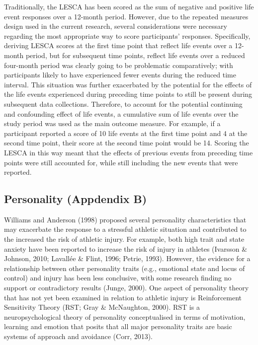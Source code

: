 \documentclass[man,floatsintext]{apa6}
\begin{document}
Traditionally, the LESCA has been scored as the sum of negative and positive life event responses over a 12-month period.
However, due to the repeated measures design used in the current research, several considerations were necessary regarding the most appropriate way to score participants' responses.
Specifically, deriving LESCA scores at the first time point that reflect life events over a 12-month period, but for subsequent time points, reflect life events over a reduced four-month period was clearly going to be problematic comparatively; with participants likely to have experienced fewer events during the reduced time interval.
This situation was further exacerbated by the potential for the effects of the life events experienced during preceding time points to still be present during subsequent data collections.
Therefore, to account for the potential continuing and confounding effect of life events, a cumulative sum of life events over the study period was used as the main outcome measure.
For example, if a participant reported a score of 10 life events at the first time point and 4 at the second time point, their score at the second time point would be 14.
Scoring the LESCA in this way meant that the effects of previous events from preceding time points were still accounted for, while still including the new events that were reported.

\hypertarget{personality-appdendix-b}{%
\subsection{Personality (Appdendix B)}\label{personality-appdendix-b}}

Williams and Anderson (1998) proposed several personality characteristics that may exacerbate the response to a stressful athletic situation and contributed to the increased the risk of athletic injury.
For example, both high trait and state anxiety have been reported to increase the risk of injury in athletes (Ivarsson \& Johnson, 2010; Lavallée \& Flint, 1996; Petrie, 1993).
However, the evidence for a relationship between other personality traits (e.g., emotional state and locus of control) and injury has been less conclusive, with some research finding no support or contradictory results (Junge, 2000).
One aspect of personality theory that has not yet been examined in relation to athletic injury is Reinforcement Sensitivity Theory (RST; Gray \& McNaughton, 2000).
RST is a neuropsychological theory of personality conceptualised in terms of motivation, learning and emotion that posits that all major personality traits are basic systems of approach and avoidance (Corr, 2013).
\end{document}
